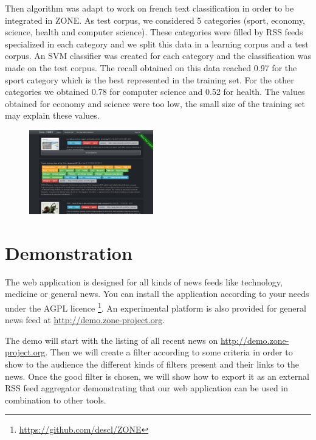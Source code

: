 \documentclass{llncs}
\begin{document}
Then algorithm was adapt to work on french text classification in order to be integrated in ZONE. As test corpus, we considered 5 categories (sport, economy, science, health and computer science). These categories were filled by RSS feeds specialized in each category and we split this data in a learning corpus and a test corpus. An SVM classifier was created for each category and the classification was made on the test corpus. The recall obtained on this data reached 0.97 for the sport category which is the best represented in the training set. For the other categories we obtained 0.78 for computer science and 0.52 for health. The values obtained for economy and science were too low, the small size of the training set may explain these values.
\begin{figure}
	\includegraphics[width=0.48\textwidth]{zone-screenshot.png}
	\label{fig:DEMO}
\end{figure}
\section{Demonstration}
%

The web application is designed for all kinds of news feeds like technology, medicine or general news. You can install the application according to your needs under the AGPL licence \footnote{\url{https://github.com/descl/ZONE}}. An experimental platform is also provided for general news feed at \url{http://demo.zone-project.org}.


The demo will start with the listing of all recent news on \url{http://demo.zone-project.org}. Then we will create a filter according to some criteria in order to show to the audience the different kinds of filters present and their links to the news. Once the good filter is chosen, we will show how to export it as an external RSS feed aggregator demonstrating that our web application can be used in combination to other tools.
\end{document}
